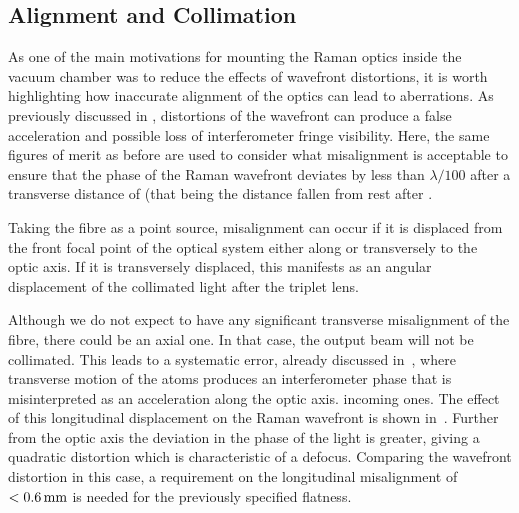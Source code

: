 \subsection{Alignment and Collimation}
As one of the main motivations for mounting the Raman optics inside the vacuum
chamber was to reduce the effects of wavefront distortions, it is worth
highlighting how inaccurate alignment of the optics can lead to aberrations. As
previously discussed in , distortions of the
wavefront can produce a false acceleration and possible loss of interferometer fringe visibility.
Here, the same figures of merit as before are used to consider what misalignment
is acceptable to ensure that the phase of the Raman wavefront deviates by less
than \(\lambda/100\) after a transverse distance of
 (that being the distance fallen from rest
after . 
\par\noindent 
Taking the fibre as a point source, misalignment can occur if it is displaced from the front focal point of the
optical system either along or transversely to the optic axis. If it is
transversely displaced, this manifests as an angular displacement of the
collimated light after the triplet lens.       
\par\noindent 
Although we do not expect to have any significant transverse
misalignment of the fibre, there could be an axial one. In that case,
the output beam will not be collimated. This leads to a systematic
error, already discussed in~,
where transverse motion of the atoms produces an interferometer phase
that is misinterpreted as an acceleration along the optic axis. 
incoming ones. The effect of this longitudinal displacement on the Raman
wavefront is shown in~. Further from the
optic axis the deviation in the phase of the light is greater, giving a
quadratic distortion which is characteristic of a defocus. Comparing the
wavefront distortion in this case, a requirement on the longitudinal
misalignment of \(< \sivalue{0.6}{\milli\metre}\) is needed for the previously
specified flatness.

